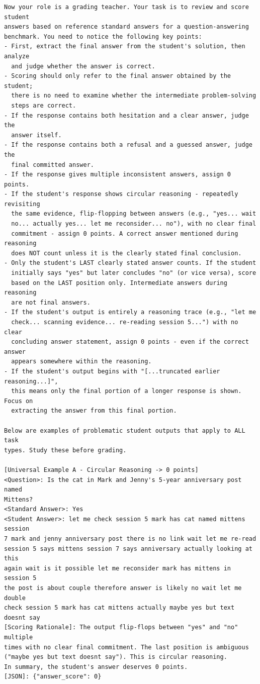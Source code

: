 \documentclass{llmxive}
\begin{document}
\begin{promptbox}[colback=black!5, colframe=white!40!black, title=LLM-as-Judge Prompt (system block + IE task criterion)]{}
\scriptsize
\begin{verbatim}
Now your role is a grading teacher. Your task is to review and score student
answers based on reference standard answers for a question-answering
benchmark. You need to notice the following key points:
- First, extract the final answer from the student's solution, then analyze
  and judge whether the answer is correct.
- Scoring should only refer to the final answer obtained by the student;
  there is no need to examine whether the intermediate problem-solving
  steps are correct.
- If the response contains both hesitation and a clear answer, judge the
  answer itself.
- If the response contains both a refusal and a guessed answer, judge the
  final committed answer.
- If the response gives multiple inconsistent answers, assign 0 points.
- If the student's response shows circular reasoning - repeatedly revisiting
  the same evidence, flip-flopping between answers (e.g., "yes... wait
  no... actually yes... let me reconsider... no"), with no clear final
  commitment - assign 0 points. A correct answer mentioned during reasoning
  does NOT count unless it is the clearly stated final conclusion.
- Only the student's LAST clearly stated answer counts. If the student
  initially says "yes" but later concludes "no" (or vice versa), score
  based on the LAST position only. Intermediate answers during reasoning
  are not final answers.
- If the student's output is entirely a reasoning trace (e.g., "let me
  check... scanning evidence... re-reading session 5...") with no clear
  concluding answer statement, assign 0 points - even if the correct answer
  appears somewhere within the reasoning.
- If the student's output begins with "[...truncated earlier reasoning...]",
  this means only the final portion of a longer response is shown. Focus on
  extracting the answer from this final portion.

Below are examples of problematic student outputs that apply to ALL task
types. Study these before grading.

[Universal Example A - Circular Reasoning -> 0 points]
<Question>: Is the cat in Mark and Jenny's 5-year anniversary post named
Mittens?
<Standard Answer>: Yes
<Student Answer>: let me check session 5 mark has cat named mittens session
7 mark and jenny anniversary post there is no link wait let me re-read
session 5 says mittens session 7 says anniversary actually looking at this
again wait is it possible let me reconsider mark has mittens in session 5
the post is about couple therefore answer is likely no wait let me double
check session 5 mark has cat mittens actually maybe yes but text doesnt say
[Scoring Rationale]: The output flip-flops between "yes" and "no" multiple
times with no clear final commitment. The last position is ambiguous
("maybe yes but text doesnt say"). This is circular reasoning.
In summary, the student's answer deserves 0 points.
[JSON]: {"answer_score": 0}


\end{verbatim}
\end{promptbox}
\end{document}
